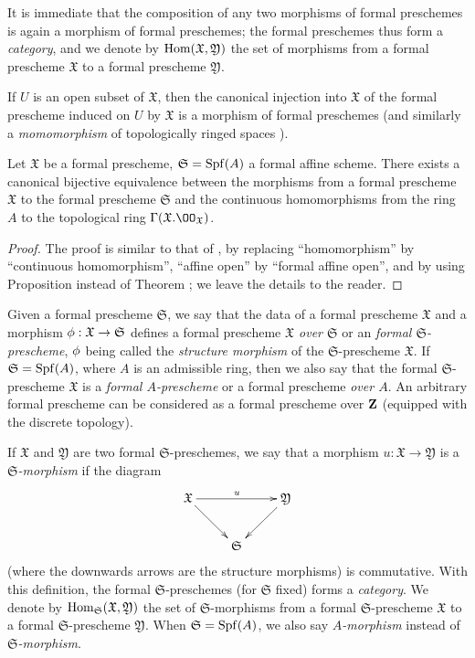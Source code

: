 It is immediate that the composition of any two morphisms of formal preschemes is again a morphism of formal preschemes; the formal preschemes thus form a \emph{category}, and we denote by $\operatorname{Hom}(\mathfrak{X},\mathfrak{Y})$ the set of morphisms from a formal prescheme $\mathfrak{X}$ to a formal prescheme $\mathfrak{Y}$.

If $U$ is an open subset of $\mathfrak{X}$, then the canonical injection into $\mathfrak{X}$ of the formal prescheme induced on $U$ by $\mathfrak{X}$ is a morphism of formal preschemes (and similarly a \emph{momomorphism} of topologically ringed spaces ).

\begin{prop}[10.4.6]
\label{1.10.4.6}
Let $\mathfrak{X}$ be a formal prescheme, $\mathfrak{S}=\operatorname{Spf}(A)$ a formal affine scheme.
There exists a canonical bijective equivalence between the morphisms from a formal prescheme $\mathfrak{X}$ to the formal prescheme $\mathfrak{S}$ and the continuous homomorphisms from the ring $A$ to the topological ring $\Gamma(\mathfrak{X}.\OO_\mathfrak{X})$.
\end{prop}

\begin{proof}
\label{proof-1.10.4.6}
The proof is similar to that of , by replacing ``homomorphism'' by ``continuous homomorphism'', ``affine open'' by ``formal affine open'', and by using Proposition  instead of Theorem ; we leave the details to the reader.
\end{proof}

\begin{env}[10.4.7]
\label{1.10.4.7}
Given a formal prescheme $\mathfrak{S}$, we say that the data of a formal prescheme $\mathfrak{X}$ and a morphism $\vphi:\mathfrak{X}\to\mathfrak{S}$ defines a formal prescheme \emph{$\mathfrak{X}$ over $\mathfrak{S}$} or an \emph{formal $\mathfrak{S}$-prescheme}, $\phi$ being called the \emph{structure morphism} of the $\mathfrak{S}$-prescheme $\mathfrak{X}$.
If $\mathfrak{S}=\operatorname{Spf}(A)$, where $A$ is an admissible ring, then we also say that the formal $\mathfrak{S}$-prescheme $\mathfrak{X}$ is a \emph{formal $A$-prescheme} or a formal prescheme \emph{over $A$}.
An arbitrary formal prescheme can be considered as a formal prescheme over $\mathbf{Z}$ (equipped with the discrete topology).

If $\mathfrak{X}$ and $\mathfrak{Y}$ are two formal $\mathfrak{S}$-preschemes, we say that a morphism $u:\mathfrak{X}\to\mathfrak{Y}$ is a \emph{$\mathfrak{S}$-morphism} if the diagram
\[
  \xymatrix{
    \mathfrak{X}\ar[rr]^u\ar[rd] & &
    \mathfrak{Y}\ar[ld]\\
    & \mathfrak{S}
  }
\]
(where the downwards arrows are the structure morphisms) is commutative.
With this definition, the formal $\mathfrak{S}$-preschemes (for $\mathfrak{S}$ fixed) forms a \emph{category}.
We denote by $\operatorname{Hom}_\mathfrak{S}(\mathfrak{X},\mathfrak{Y})$ the set of $\mathfrak{S}$-morphisms from a formal $\mathfrak{S}$-prescheme $\mathfrak{X}$ to a formal $\mathfrak{S}$-prescheme $\mathfrak{Y}$.
When $\mathfrak{S}=\operatorname{Spf}(A)$, we also say \emph{$A$-morphism} instead of \emph{$\mathfrak{S}$-morphism}.
\end{env}

